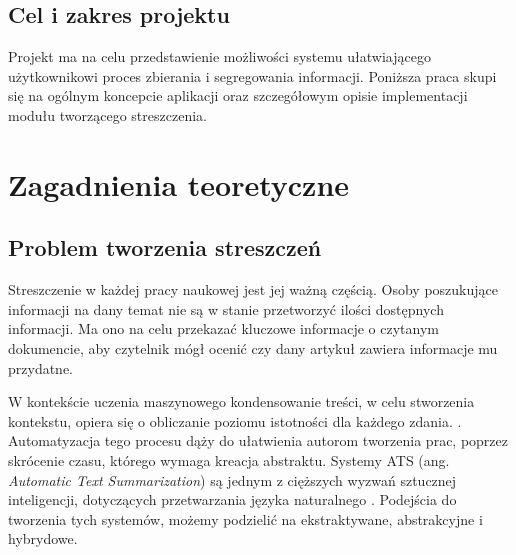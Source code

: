 \documentclass[12pt,a4paper,twoside]{article}
\begin{document}
\subsection*{Cel i zakres projektu}
Projekt ma na celu przedstawienie możliwości systemu ułatwiającego użytkownikowi proces zbierania i segregowania informacji. Poniższa praca skupi się na ogólnym koncepcie aplikacji oraz szczegółowym opisie implementacji modułu tworzącego streszczenia.
\newpage
\section{Zagadnienia teoretyczne}
\subsection{Problem tworzenia streszczeń}
Streszczenie w każdej pracy naukowej jest jej ważną częścią. Osoby poszukujące informacji na dany temat nie są w stanie przetworzyć ilości dostępnych informacji. Ma ono na celu przekazać kluczowe informacje o czytanym dokumencie, aby czytelnik mógł ocenić czy dany artykuł zawiera informacje mu przydatne. \par
W kontekście uczenia maszynowego kondensowanie treści, w celu stworzenia kontekstu, opiera się o obliczanie poziomu istotności dla każdego zdania. \cite{MUTLU2020102359}. Automatyzacja tego procesu dąży do ułatwienia autorom tworzenia prac, poprzez skrócenie czasu, którego wymaga kreacja abstraktu. Systemy ATS (ang. \textit{Automatic Text Summarization}) są jednym z cięższych wyzwań sztucznej inteligencji, dotyczących przetwarzania języka naturalnego \cite{ELKASSAS2021113679}. Podejścia do tworzenia tych systemów, możemy podzielić na ekstraktywane, abstrakcyjne i hybrydowe. 
\end{document}
